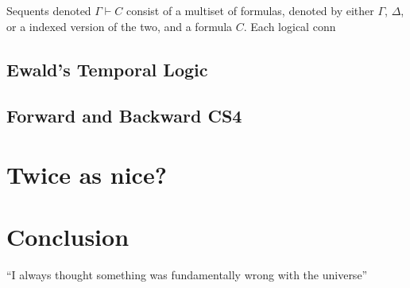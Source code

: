 \documentclass{article}
\begin{document}
Sequents denoted $\Gamma \vdash C$ consist of a multiset of formulas, denoted by either $\Gamma$, $\Delta$, or a indexed version of the two, and a formula $C$.  Each logical conn

\subsection{Ewald's Temporal Logic}
\subsection{Forward and Backward CS4}
\section{Twice as nice?}


\section{Conclusion}
``I always thought something was fundamentally wrong with the universe'' 



\end{document}
